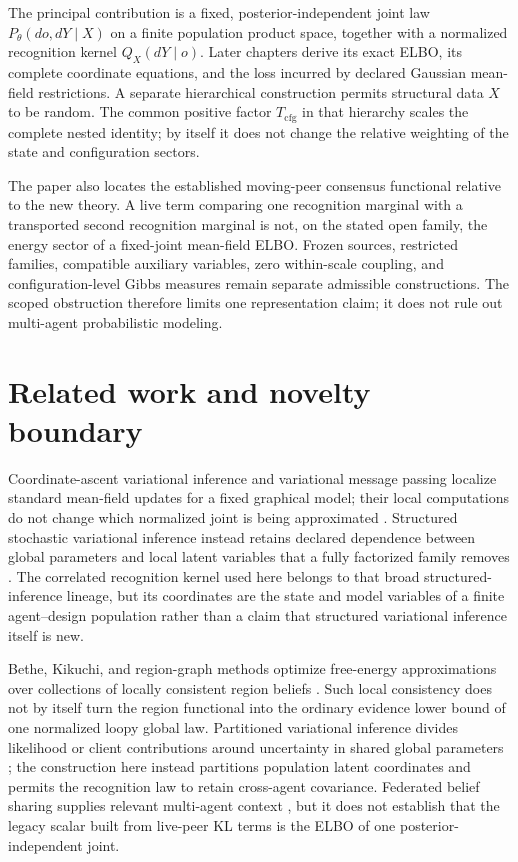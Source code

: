 The principal contribution is a fixed, posterior-independent joint law \(P_\theta(do,dY\mid X)\) on a finite population product space, together with a normalized recognition kernel \(Q_X(dY\mid o)\). Later chapters derive its exact ELBO, its complete coordinate equations, and the loss incurred by declared Gaussian mean-field restrictions. A separate hierarchical construction permits structural data \(X\) to be random. The common positive factor \(T_{\mathrm{cfg}}\) in that hierarchy scales the complete nested identity; by itself it does not change the relative weighting of the state and configuration sectors.

The paper also locates the established moving-peer consensus functional relative to the new theory. A live term comparing one recognition marginal with a transported second recognition marginal is not, on the stated open family, the energy sector of a fixed-joint mean-field ELBO. Frozen sources, restricted families, compatible auxiliary variables, zero within-scale coupling, and configuration-level Gibbs measures remain separate admissible constructions. The scoped obstruction therefore limits one representation claim; it does not rule out multi-agent probabilistic modeling.

\section{Related work and novelty boundary}

Coordinate-ascent variational inference and variational message passing localize standard mean-field updates for a fixed graphical model; their local computations do not change which normalized joint is being approximated \citep{WinnBishop2005,Blei2017,Wainwright2008}. Structured stochastic variational inference instead retains declared dependence between global parameters and local latent variables that a fully factorized family removes \citep{HoffmanBlei2015}. The correlated recognition kernel used here belongs to that broad structured-inference lineage, but its coordinates are the state and model variables of a finite agent--design population rather than a claim that structured variational inference itself is new.

Bethe, Kikuchi, and region-graph methods optimize free-energy approximations over collections of locally consistent region beliefs \citep{Yedidia2005,Wainwright2008}. Such local consistency does not by itself turn the region functional into the ordinary evidence lower bound of one normalized loopy global law. Partitioned variational inference divides likelihood or client contributions around uncertainty in shared global parameters \citep{Ashman2022PVI}; the construction here instead partitions population latent coordinates and permits the recognition law to retain cross-agent covariance. Federated belief sharing supplies relevant multi-agent context \citep{friston2024federated}, but it does not establish that the legacy scalar built from live-peer KL terms is the ELBO of one posterior-independent joint.

